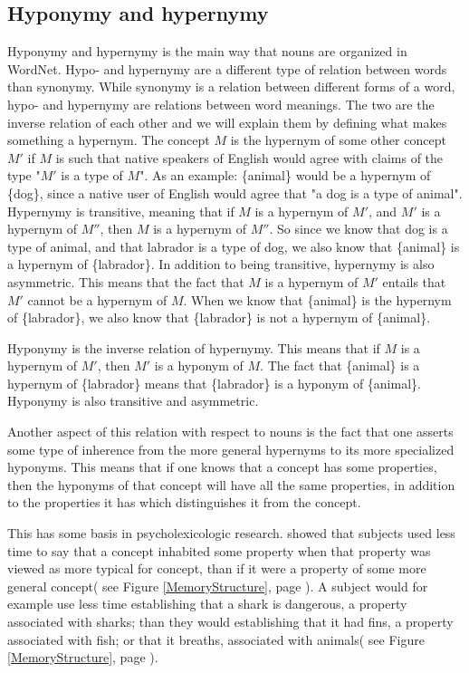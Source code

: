 \subsection{Hyponymy and hypernymy}
\label{Hypernymy}
Hyponymy and hypernymy is the main way that nouns are organized in WordNet.
Hypo- and hypernymy are a different type of relation between words than synonymy.
While synonymy is a relation between different forms of a word,
hypo- and hypernymy are relations between word meanings.
The two are the inverse relation of each other and we will explain them by defining what makes something a hypernym.
The concept $M$ is the hypernym of some other concept $M'$ if $M$ is such that native speakers of English would agree
with claims of the type "$M'$ is a type of $M$".
As an example: \{animal\} would be a hypernym of \{dog\},
since a native user of English would agree that "a dog is a type of animal".
Hypernymy is transitive, meaning that if $M$ is a hypernym of $M'$, and $M'$ is a hypernym of $M''$,
then $M$ is a hypernym of $M''$.
So since we know that dog is a type of animal, and that labrador is a type of dog,
we also know that \{animal\} is a hypernym of \{labrador\}.
In addition to being transitive, hypernymy is also asymmetric.
This means that the fact that $M$ is a hypernym of $M'$ entails that $M'$ cannot be a hypernym of $M$.
When we know that \{animal\} is the hypernym of \{labrador\},
we also know that \{labrador\} is not a hypernym of \{animal\}\citep{Miller1990}.

Hyponymy is the inverse relation of hypernymy.
This means that if $M$ is a hypernym of $M'$, then $M'$ is a hyponym of $M$.
The fact that \{animal\} is a hypernym of \{labrador\} means that \{labrador\} is a hyponym of \{animal\}.
Hyponymy is also transitive and asymmetric\citep{Miller1990}.

Another aspect of this relation with respect to nouns is the fact that one asserts some type of inherence from the more
general hypernyms to its more specialized hyponyms.
This means that if one knows that a concept has some properties,
then the hyponyms of that concept will have all the same properties,
in addition to the properties it has which distinguishes it from the concept\citep{Miller1990a}.

This has some basis in psycholexicologic research.
\citet{Collins1969} showed that subjects used less time to say that a concept inhabited some property when that property
was viewed as more typical for concept, than if it were a property of some more general concept( see Figure \ref{MemoryStructure}, page \pageref{MemoryStructure}).
A subject would for example use less time establishing that a shark is dangerous, a property associated with sharks;
than they would establishing that it had fins, a property associated with fish; or that it breaths, associated with animals( see Figure \ref{MemoryStructure}, page \pageref{MemoryStructure}).

